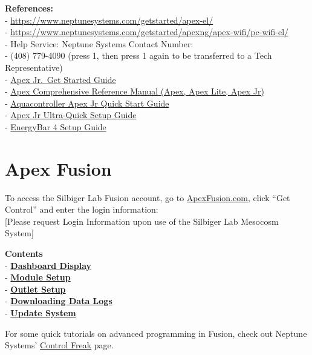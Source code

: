 \documentclass[
]{book}
\begin{document}
\textbf{References:}\\
- \url{https://www.neptunesystems.com/getstarted/apex-el/}\\
- \url{https://www.neptunesystems.com/getstarted/apexng/apex-wifi/pc-wifi-el/}\\
- Help Service: Neptune Systems Contact Number:\\
- (408) 779-4090 (press 1, then press 1 again to be transferred to a Tech Representative)\\
- \href{https://www.neptunesystems.com/getstarted/apexjr/}{Apex Jr.~Get Started Guide}\\
- \href{https://www.neptunesystems.com/downloads/docs/Comprehensive_Reference_Manual.pdf}{Apex Comprehensive Reference Manual (Apex, Apex Lite, Apex Jr)}\\
- \href{https://www.neptunesystems.com/downloads/docs/AquaController-Apex-Jr-Quickstart.pdf}{Aquacontroller Apex Jr Quick Start Guide}\\
- \href{https://www.neptunesystems.com/downloads/docs/Quick-Start-Apex-Jr-Fullsheet-v1-web.pdf}{Apex Jr Ultra-Quick Setup Guide}\\
- \href{https://www.neptunesystems.com/downloads/docs/EB4_manual.pdf}{EnergyBar 4 Setup Guide}

\hypertarget{apex-fusion}{%
\chapter{Apex Fusion}\label{apex-fusion}}

To access the Silbiger Lab Fusion account, go to \href{https://apexfusion.com}{ApexFusion.com}, click ``Get Control'' and enter the login information:\\
{[}Please request Login Information upon use of the Silbiger Lab Mesocosm System{]}

\textbf{Contents}\\
- \protect\hyperlink{Dashboard}{\textbf{Dashboard Display}}\\
- \protect\hyperlink{Module_Setup}{\textbf{Module Setup}}\\
- \protect\hyperlink{Outlet_Setup}{\textbf{Outlet Setup}}\\
- \protect\hyperlink{Data_Logs}{\textbf{Downloading Data Logs}}\\
- \protect\hyperlink{Update}{\textbf{Update System}}

For some quick tutorials on advanced programming in Fusion, check out Neptune Systems' \href{https://www.neptunesystems.com/getstarted/apexng/apex-control-freak-advanced/}{Control Freak} page.
\end{document}
